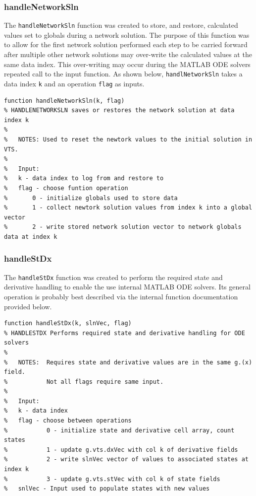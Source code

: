 \subsubsection{handleNetworkSln}  
The \verb|handleNetworkSln| function was created to store, and restore, calculated values set to globals during a network solution.
The purpose of this function was to allow for the first network solution performed each step to be carried forward after multiple other network solutions may over-write the calculated values at the same data index.
This over-writing may occur during the MATLAB ODE solvers repeated call to the input function.
As shown below, \verb|handlNetworkSln| takes a data index \verb|k| and an operation \verb|flag| as inputs.
\begin{verbatim}
function handleNetworkSln(k, flag)
% HANDLENETWORKSLN saves or restores the network solution at data index k
%
%   NOTES: Used to reset the newtork values to the initial solution in VTS.
%
%   Input:
%   k - data index to log from and restore to
%   flag - choose funtion operation
%       0 - initialize globals used to store data
%       1 - collect newtork solution values from index k into a global vector
%       2 - write stored network solution vector to network globals data at index k
\end{verbatim}

\subsubsection{handleStDx}  
The \verb|handleStDx| function was created to perform the required state and derivative handling to enable the use internal MATLAB ODE solvers.
Its general operation is probably best described via the internal function documentation provided below.

\begin{verbatim}
function handleStDx(k, slnVec, flag)
% HANDLESTDX Performs required state and derivative handling for ODE solvers
%
%   NOTES:  Requires state and derivative values are in the same g.(x) field.
%           Not all flags require same input.
%
%   Input:
%   k - data index
%   flag - choose between operations
%           0 - initialize state and derivative cell array, count states
%           1 - update g.vts.dxVec with col k of derivative fields
%           2 - write slnVec vector of values to associated states at index k
%           3 - update g.vts.stVec with col k of state fields
%   snlVec - Input used to populate states with new values
\end{verbatim}

